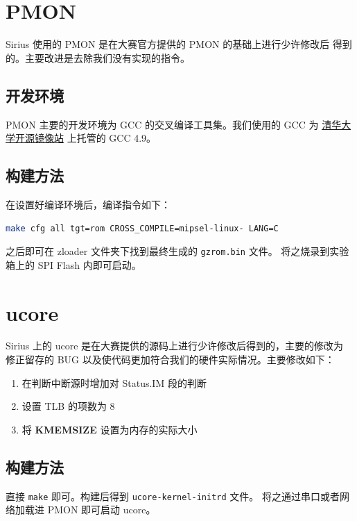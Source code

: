\documentclass[blue,normal,cn,hide]{elegantbook}
\begin{document}
\section{PMON}

Sirius 使用的 PMON 是在大赛官方提供的 PMON 的基础上进行少许修改后
得到的。主要改进是去除我们没有实现的指令。

\subsection{开发环境}

PMON 主要的开发环境为 GCC 的交叉编译工具集。我们使用的 GCC 为
\href{https://mirrors.tuna.tsinghua.edu.cn/}{清华大学开源镜像站}
上托管的 GCC 4.9。

\subsection{构建方法}

在设置好编译环境后，编译指令如下：

\begin{lstlisting}[language=bash]
	make cfg all tgt=rom CROSS_COMPILE=mipsel-linux- LANG=C
\end{lstlisting}

之后即可在 zloader 文件夹下找到最终生成的 \texttt{gzrom.bin} 文件。
将之烧录到实验箱上的 SPI Flash 内即可启动。

\section{ucore}

Sirius 上的 ucore 是在大赛提供的源码上进行少许修改后得到的，主要的修改为
修正留存的 BUG 以及使代码更加符合我们的硬件实际情况。主要修改如下：

\begin{enumerate}
    \item 在判断中断源时增加对 Status.IM 段的判断
    \item 设置 TLB 的项数为 8
    \item 将 \textbf{KMEMSIZE} 设置为内存的实际大小
\end{enumerate}

\subsection{构建方法}

直接 \texttt{make} 即可。构建后得到 \texttt{ucore-kernel-initrd} 文件。
将之通过串口或者网络加载进 PMON 即可启动 ucore。
\end{document}
